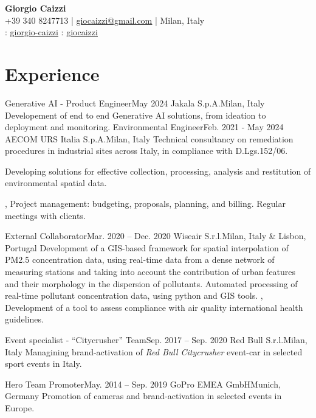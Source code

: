 \documentclass[letterpaper,11pt]{article}
\begin{document}
\begin{center}
  \textbf{\Huge \bfseries Giorgio Caizzi} \\
  \vspace{3pt}
  \small +39 340 8247713 | \href{mailto:giocaizzi@gmail.com}{\underline{giocaizzi@gmail.com}}
  | Milan, Italy\\
  \vspace{3pt}
  \faLinkedinSquare{} : \href{https://linkedin.com/in/giorgio-caizzi/}{\underline{giorgio-caizzi}}
  \faGithubSquare{} : \href{https://www.github.com/giocaizzi/}{\underline{giocaizzi}}\\
\end{center}
\vspace{-30pt}

\section{Experience}
\begin{sectionElementsList}
  \experienceElement
  {Generative AI - Product Engineer}{May 2024}
  {Jakala S.p.A.}{Milan, Italy}
  {
    Developement of end to end Generative AI solutions, from ideation to deployment and monitoring.
  }{
  }
  \experienceElement
  {Environmental Engineer}{Feb. 2021 - May 2024}
  {AECOM URS Italia S.p.A.}{Milan, Italy}
  {
    Technical consultancy on remediation procedures in industrial sites across Italy, in compliance with D.Lgs.152/06.
  }{
    {
        Developing solutions for effective collection, processing, analysis and restitution of environmental spatial data.

      },
    {
        Project management: budgeting, proposals, planning, and billing. Regular meetings with clients.
      }
  }
  \experienceElement
  {External Collaborator}{Mar. 2020 -- Dec. 2020}
  {Wiseair S.r.l.}{Milan, Italy \& Lisbon, Portugal}
  {
    Development of a GIS-based framework for spatial interpolation of PM2.5 concentration
    data, using real-time data from a dense network of measuring stations and taking into account the contribution of
    urban features and their morphology in the dispersion of pollutants.
  }
  {
    {
        Automated processing of real-time pollutant concentration data, using python and GIS tools.
      },
    {
        Development of a tool to assess compliance with air quality international health guidelines.
      }
  }

  \experienceElement
  {Event specialist - “Citycrusher” Team}{Sep. 2017 -- Sep. 2020}
  {Red Bull S.r.l.}{Milan, Italy}
  {Managining brand-activation of \textit{Red Bull Citycrusher} event-car in selected sport
    events in Italy.}
  {}

  \experienceElement
  {Hero Team Promoter}{May. 2014 -- Sep. 2019}
  {GoPro EMEA GmbH}{Munich, Germany}
  {Promotion of cameras and brand-activation in selected events in Europe.}
  {}
\end{sectionElementsList}
\end{document}
